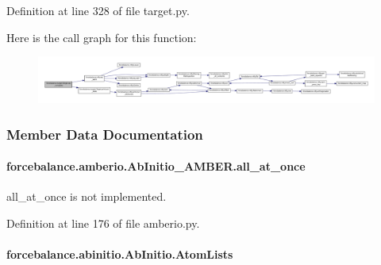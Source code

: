 Definition at line 328 of file target.\-py.



Here is the call graph for this function\-:\nopagebreak
\begin{figure}[H]
\begin{center}
\leavevmode
\includegraphics[width=350pt]{classforcebalance_1_1target_1_1Target_af6099ec09486213869dba2491bd8ea04_cgraph}
\end{center}
\end{figure}




\subsubsection{Member Data Documentation}
\hypertarget{classforcebalance_1_1amberio_1_1AbInitio__AMBER_a39462b1942be0f7fb6202862ad1afa9c}{
\paragraph[{all\-\_\-at\-\_\-once}]{\setlength{\rightskip}{0pt plus 5cm}forcebalance.\-amberio.\-Ab\-Initio\-\_\-\-A\-M\-B\-E\-R.\-all\-\_\-at\-\_\-once}}\label{classforcebalance_1_1amberio_1_1AbInitio__AMBER_a39462b1942be0f7fb6202862ad1afa9c}


all\-\_\-at\-\_\-once is not implemented. 



Definition at line 176 of file amberio.\-py.

\hypertarget{classforcebalance_1_1abinitio_1_1AbInitio_a7e62a74e820ac0c5dd67f49155b95c41}{
\paragraph[{Atom\-Lists}]{\setlength{\rightskip}{0pt plus 5cm}forcebalance.\-abinitio.\-Ab\-Initio.\-Atom\-Lists\hspace{0.3cm}{\ttfamily [inherited]}}}\label{classforcebalance_1_1abinitio_1_1AbInitio_a7e62a74e820ac0c5dd67f49155b95c41}


